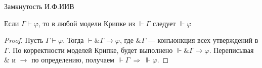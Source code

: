\documentclass[aspectratio=169]{beamer}
\begin{document}
\begin{comment}
\begin{frame}{Пример}
\begin{exm}
	Докажем $\vdash \varphi \rightarrow \psi \rightarrow \varphi$
	
	\[
	\infer[(\text{Введение импликации})]
	{ \vdash \varphi \to (\psi \to \varphi) }
	{ \infer[(\text{Введение импликации})]
		{ \varphi \vdash \psi \to \varphi }
		{\varphi, \psi \vdash \varphi}
	}
	\]
\end{exm}

\begin{exm}
	Докажем $\alpha \rightarrow \beta \rightarrow \gamma, \; \alpha, \; \beta \vdash \gamma$
	
	\[
	\infer
	{ \alpha \rightarrow \beta \rightarrow \gamma, \; \alpha, \; \beta \vdash \gamma}{\infer
		{\alpha \rightarrow \beta \rightarrow \gamma, \; \alpha, \; \beta \vdash \beta \rightarrow \gamma }{\alpha \rightarrow \beta \rightarrow \gamma, \; \alpha, \; \beta \vdash \alpha \rightarrow \beta \rightarrow \gamma && \alpha \rightarrow \beta \rightarrow \gamma, \; \alpha, \; \beta \vdash \alpha} && \alpha \rightarrow \beta \rightarrow \gamma, \alpha, \; \beta \vdash \beta}
	\]
	
\end{exm}

\end{frame}
\end{comment}

\begin{frame}{Замкнутость И.Ф.ИИВ}

\begin{lemma}
	\label{conj}
	Если $\Gamma \vdash \varphi$, то в любой модели Крипке из $\Vdash \Gamma$ следует $\Vdash \varphi$
\end{lemma}
\begin{proof}
	Пусть $\Gamma \vdash \varphi$. 
	Тогда $\vdash \& \Gamma \rightarrow \varphi$, где $\& \Gamma$ --- конъюнкция всех утверждений в $\Gamma$.
	По корректности моделей Крипке, будет выполнено $\Vdash \& \Gamma \rightarrow \varphi$. Переписывая $\&$ и $\rightarrow$ по определению, получаем $\Vdash \Gamma \ \Rightarrow \ \Vdash \varphi$.
\end{proof}
\end{frame}
\end{document}

